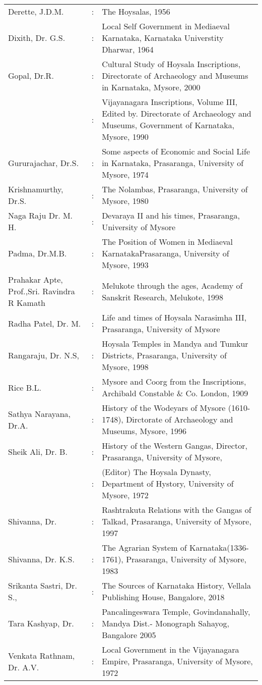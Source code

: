 {\renewcommand{\arraystretch}{.9}
\begin{longtable}[l]{@{}>{\raggedright}p{4.5cm}cp{9.3cm}<{\raggedright}@{}}
Derette, J.D.M. & : & The Hoysalas, 1956\\
Dixith, Dr. G.S. & : & Local Self Government in Mediaeval Karnataka, Karnataka Universtity Dharwar, 1964\\
Gopal, Dr.R. & : &  Cultural Study of Hoysala Inscriptions, Directorate of Archaeology and Museums in Karnataka, Mysore, 2000\\
& : & Vijayanagara Inscriptions, Volume III, Edited by. Directorate of Archaeology and Museums, Government of Karnataka, Mysore, 1990\\
Gururajachar, Dr.S. & : & Some aspects of Economic and Social Life in Karnataka, Prasaranga, University of Mysore, 1974\\
Krishnamurthy, Dr.S. & : & The Nolambas, Prasaranga, University of Mysore, 1980\\
Naga Raju Dr. M. H. & : & Devaraya II and his times, Prasaranga, University of Mysore\\ 
Padma, Dr.M.B. & : & The Position of Women in Mediaeval KarnatakaPrasaranga, University of Mysore, 1993\\
Prahakar Apte, Prof.,\newline Sri. Ravindra R Kamath & : & Melukote through the ages, Academy of Sanskrit Research, Melukote, 1998\\
Radha Patel, Dr. M. & : & Life and times of Hoysala Narasimha III, Prasaranga, University of Mysore\\
Rangaraju, Dr. N.S, & : & Hoysala Temples in Mandya and Tumkur Districts, Prasaranga, University of Mysore, 1998\\
Rice B.L. & : & Mysore and Coorg from the Inscriptions, Archibald Constable \& Co. London, 1909\\
Sathya Narayana, Dr.A. & : & History of the Wodeyars of Mysore (1610-1748), Dirctorate of Archaeology and Museums, Mysore, 1996\\
Sheik Ali, Dr. B. & : & History of the Western Gangas, Director, Prasaranga, University of Mysore,\\
& : &  (Editor) The Hoysala Dynasty, Department of Hystory, University of Mysore, 1972\\
Shivanna, Dr. & : & Rashtrakuta Relations with the Gangas of Talkad, Prasaranga, University of Mysore, 1997\\
Shivanna, Dr. K.S. & : & The Agrarian System of Karnataka(1336-1761), Prasaranga, University of Mysore, 1983\\
Srikanta Sastri, Dr. S., & : & The Sources of Karnataka History, Vellala Publishing House, Bangalore, 2018\\
Tara Kashyap, Dr. & : & Pancalingeswara Temple, Govindanahally, Mandya Dist.- Monograph Sahayog, Bangalore 2005\\
Venkata Rathnam, Dr. A.V. & : & Local Government in the Vijayanagara Empire, Prasaranga, University of Mysore, 1972\\
\end{longtable}}\relax
